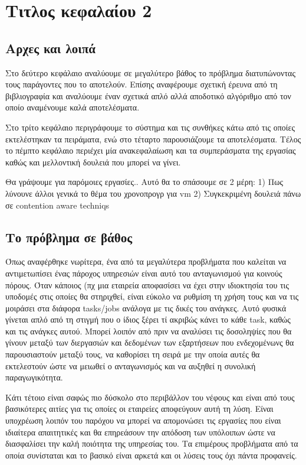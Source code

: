 \usepackage{tikz}
\usetikzlibrary{arrows}

\chapter{Τιτλος κεφαλαίου 2}
\section{Αρχες και λοιπά}
Στο δεύτερο κεφάλαιο αναλύουμε σε μεγαλύτερο βάθος το πρόβλημα διατυπώνοντας
τους παράγοντες που το αποτελούν. Επίσης αναφέρουμε σχετική έρευνα από τη
βιβλιογραφία και αναλύουμε έναν σχετικά απλό αλλά αποδοτικό αλγόριθμο από τον
οποίο αναμένουμε καλά αποτελέσματα.

Στο τρίτο κεφάλαιο περιγράφουμε το σύστημα και τις συνθήκες κάτω από τις οποίες
εκτελέστηκαν τα πειράματα, ενώ στο τέταρτο παρουσιάζουμε τα αποτελέσματα. Τέλος
το πέμπτο κεφάλαιο περιέχει μία ανακεφαλαίωση και τα συμπεράσματα της εργασίας
καθώς και μελλοντική δουλειά που μπορεί να γίνει.

Θα γράψουμε για παρόμοιες εργασίες.. Αυτό θα το σπάσουμε σε 2 μέρη:
1) Πως λύνουνε άλλοι γενικά το θέμα του χρονοπρογρ για vm
2) Συγκεκριμένη δουλειά πάνω σε contention aware techniqs
\section{Το πρόβλημα σε βάθος}
Όπως αναφέρθηκε νωρίτερα, ένα από τα μεγαλύτερα προβλήματα που καλείται να
αντιμετωπίσει ένας πάροχος υπηρεσιών είναι αυτό του ανταγωνισμού για κοινούς
πόρους. Όταν κάποιος (πχ μια εταιρεία αποφασίσει να έχει στην ιδιοκτησία του τις
υποδομές στις οποίες θα στηριχθεί, είναι εύκολο να ρυθμίση τη χρήση τους και να
τις μοιράσει στα διάφορα tasks/jobs ανάλογα με τις δικές του ανάγκες. Αυτό
φυσικά γίνεται απλό από τη στιγμή που ο ίδιος ξέρει τί ακριβώς κάνει το κάθε
task, καθώς και τις ανάγκες αυτού. Μπορεί λοιπόν από πριν να αναλύσει τις
δοσοληψίες που θα γίνουν μεταξύ των διεργασιών και δεδομένων των εξαρτήσεων που
ενδεχομένωνς θα παρουσιαστούν μεταξύ τους, να καθορίσει τη σειρά με την οποία
αυτές θα εκτελεστούν ώστε να μειωθεί ο ανταγωνισμός και να αυξηθεί η
συνολική παραγωγικότητα.

Κάτι τέτοιο είναι σαφώς πιο δύσκολο στο περιβάλλον του νέφους και είναι από τους
βασικότερες αιτίες για τις οποίες οι εταιρείες αποφεύγουν αυτή τη λύση. Είναι
υποχρέωση λοιπόν του παρόχου να μπορεί να απομονώσει τις εργασίες που είναι
ιδιαίτερα απαιτητικές και θα επηρεάσουν την απόδοση των υπόλοιπων ώστε να
διασφαλίσει την καλή ποιότητα της υπηρεσίας του. Τα επιμέρους προβλήματα από τα
οποία συνίσταται και το βασικό είναι αρκετά και οι λύσεις τους όχι πάντα
προφανείς.

